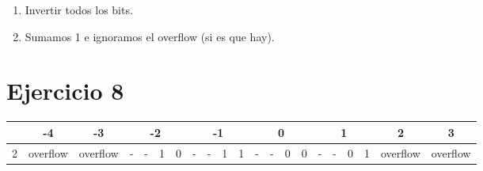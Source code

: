 \begin{enumerate}
  \item Invertir todos los bits.
  \item Sumamos 1 e ignoramos el overflow (si es que hay).
\end{enumerate}

\section{Ejercicio 8}

\begin{table}[ht]
  \ttfamily
  \setlength\tabcolsep{5.3pt}
  \begin{tabular}{|c|cccc|cccc|cccc|cccc|cccc|cccc|cccc|cccc|}
  \hline
    & \multicolumn{4}{c|}{-4}                                                                                                      & \multicolumn{4}{c|}{-3}                                                                                                      & \multicolumn{4}{c|}{-2}                                                                                                                              & \multicolumn{4}{c|}{-1}                                                                                                                              & \multicolumn{4}{c|}{0}                                                                                                                               & \multicolumn{4}{c|}{1}                                                                                                                               & \multicolumn{4}{c|}{2}                                                                                                       & \multicolumn{4}{c|}{3}                                                                                                       \\ \hline
  2 & \multicolumn{4}{c|}{\cellcolor[HTML]{C0C0C0}overflow}                                                                        & \multicolumn{4}{c|}{\cellcolor[HTML]{C0C0C0}overflow}                                                                        & \multicolumn{1}{c|}{\cellcolor[HTML]{C0C0C0}-} & \multicolumn{1}{c|}{\cellcolor[HTML]{C0C0C0}-} & \multicolumn{1}{c|}{\cellcolor[HTML]{EFEFEF}1} & 0 & \multicolumn{1}{c|}{\cellcolor[HTML]{C0C0C0}-} & \multicolumn{1}{c|}{\cellcolor[HTML]{C0C0C0}-} & \multicolumn{1}{c|}{\cellcolor[HTML]{EFEFEF}1} & 1 & \multicolumn{1}{c|}{\cellcolor[HTML]{C0C0C0}-} & \multicolumn{1}{c|}{\cellcolor[HTML]{C0C0C0}-} & \multicolumn{1}{c|}{\cellcolor[HTML]{EFEFEF}0} & 0 & \multicolumn{1}{c|}{\cellcolor[HTML]{C0C0C0}-} & \multicolumn{1}{c|}{\cellcolor[HTML]{C0C0C0}-} & \multicolumn{1}{c|}{\cellcolor[HTML]{EFEFEF}0} & 1 & \multicolumn{4}{c|}{\cellcolor[HTML]{C0C0C0}overflow}                                                                        & \multicolumn{4}{c|}{\cellcolor[HTML]{C0C0C0}overflow}                                                                        \\ \hline

\end{tabular}
\end{table}
